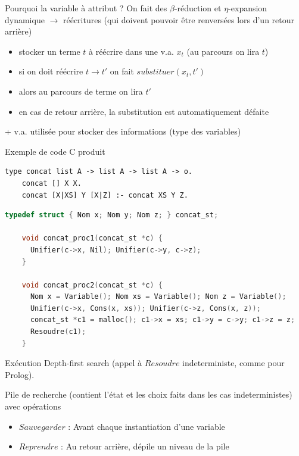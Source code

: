 \documentclass[aspectratio=169]{beamer}
\begin{document}
\begin{frame}{Pourquoi la variable à attribut ?}
  On fait des $\beta$-réduction et $\eta$-expansion dynamique $\rightarrow$ réécritures (qui doivent pouvoir être renversées lors d'un retour arrière)

  \begin{itemize}
    \item stocker un terme $t$ à réécrire dans une v.a. $x_t$ (au parcours on lira $t$)
    \item si on doit réécrire $t \rightarrow t'$ on fait $substituer(x_t, t')$
    \item alors au parcours de terme on lira $t'$
    \item en cas de retour arrière, la substitution est automatiquement défaite
  \end{itemize}

  + v.a. utilisée pour stocker des informations (type des variables)
\end{frame}

\begin{frame}[fragile]{Exemple de code C produit}
  \begin{lstlisting}[language=lprolog]
    type concat list A -> list A -> list A -> o.
    concat [] X X.
    concat [X|XS] Y [X|Z] :- concat XS Y Z.
  \end{lstlisting}

  \begin{lstlisting}[language=C,keywordstyle=\color{blue}\ttfamily]
    typedef struct { Nom x; Nom y; Nom z; } concat_st;

    void concat_proc1(concat_st *c) {
      Unifier(c->x, Nil); Unifier(c->y, c->z);
    }

    void concat_proc2(concat_st *c) {
      Nom x = Variable(); Nom xs = Variable(); Nom z = Variable();
      Unifier(c->x, Cons(x, xs)); Unifier(c->z, Cons(x, z));
      concat_st *c1 = malloc(); c1->x = xs; c1->y = c->y; c1->z = z;
      Resoudre(c1);
    }
  \end{lstlisting}
\end{frame}

\begin{frame}{Exécution}
  Depth-first search (appel à $Resoudre$ indeterministe, comme pour Prolog).

  Pile de recherche (contient l'état et les choix faits dans les cas indeterministes) avec opérations
  \begin{itemize}
    \item $Sauvegarder$ : Avant chaque instantiation d'une variable
    \item $Reprendre$ : Au retour arrière, dépile un niveau de la pile
  \end{itemize}
\end{frame}
\end{document}
